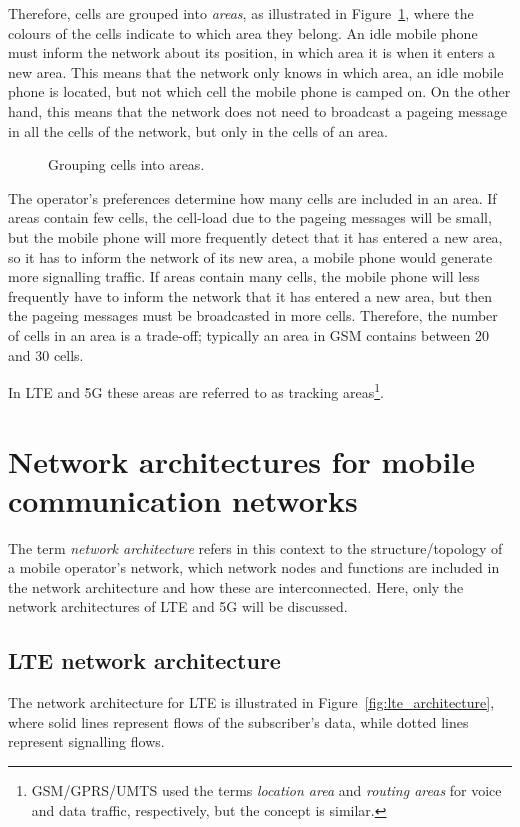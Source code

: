 Therefore, cells are grouped into \emph{areas}, as illustrated in Figure~\ref{fig:locationareas}, where the colours of the cells indicate to which area they belong. An idle mobile phone must inform the network about its position, \ie in which area it is when it enters a new area. This means that the network only knows in which area, an idle mobile phone is located, but not which cell the mobile phone is camped on. On the other hand, this means that the network does not need to broadcast a pageing message in all the cells of the network, but only in the cells of an area.

\begin{figure}[htbp]
	\centering
	\caption{\label{fig:locationareas}Grouping cells into areas.}
\end{figure}

The operator's preferences determine how many cells are included in an area. If areas contain few cells, the cell-load due to the pageing messages will be small, but the mobile phone will more frequently detect that it has entered a new area, so it has to inform the network of its new area, \ie a mobile phone would generate more signalling traffic. If areas contain many cells, the mobile phone will less frequently have to inform the network that it has entered a new area, but then the pageing messages must be broadcasted in  more cells. Therefore, the number of cells in an area is a trade-off; typically an area in GSM contains between 20 and 30 cells.

In LTE and 5G these areas are referred to as tracking areas\footnote{GSM/GPRS/UMTS used the terms \emph{location area} and \emph{routing areas} for voice and data traffic, respectively, but the concept is similar.}.

\section{Network architectures for mobile communication networks}
\label{sec:mobile_netarch}
The term \emph{network architecture} refers in this context to the structure/topology of a mobile operator's network, \ie which network nodes and functions are included in the network architecture and how these are interconnected. Here, only the network architectures of LTE and 5G will be discussed.

\subsection{LTE network architecture}
The network architecture for LTE is illustrated in Figure~\ref{fig:lte_architecture}, where solid lines represent flows of the subscriber's data, while dotted lines represent signalling flows.

